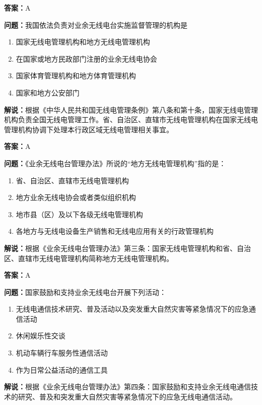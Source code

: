 \textbf{答案：}A

\textbf{问题：}我国依法负责对业余无线电台实施监督管理的机构是

\begin{enumerate}[label=\Alph*), leftmargin=3em]
	\item 国家无线电管理机构和地方无线电管理机构
	\item 在国家或地方民政部门注册的业余无线电协会
	\item 国家体育管理机构和地方体育管理机构
	\item 国家和地方公安部门
\end{enumerate}

\textbf{解说：}根据《中华人民共和国无线电管理条例》第八条和第十条，国家无线电管理机构负责全国无线电管理工作。省、自治区、直辖市无线电管理机构在国家无线电管理机构协调下处理本行政区域无线电管理相关事宜。

\textbf{答案：}A

\textbf{问题：}《业余无线电台管理办法》所说的“地方无线电管理机构”指的是：

\begin{enumerate}[label=\Alph*), leftmargin=3em]
	\item 省、自治区、直辖市无线电管理机构
	\item 地方业余无线电协会或者类似组织机构
	\item 地市县（区）及以下各级无线电管理机构
	\item 各地方与无线电设备生产销售和无线电应用有关的行政管理机构
\end{enumerate}
\textbf{解说：}根据《业余无线电台管理办法》第三条：国家无线电管理机构和省、自治区、直辖市无线电管理机构简称地方无线电管理机构。

\textbf{答案：}A

\textbf{问题：}国家鼓励和支持业余无线电台开展下列活动：

\begin{enumerate}[label=\Alph*), leftmargin=3em]
	\item 无线电通信技术研究、普及活动以及突发重大自然灾害等紧急情况下的应急通信活动
	\item 休闲娱乐性交谈
	\item 机动车辆行车服务性通信活动
	\item 作为日常公益活动的通信工具
\end{enumerate}

\textbf{解说：}根据《业余无线电台管理办法》第四条：国家鼓励和支持业余无线电通信技术的研究、普及和突发重大自然灾害等紧急情况下的应急无线电通信活动。

